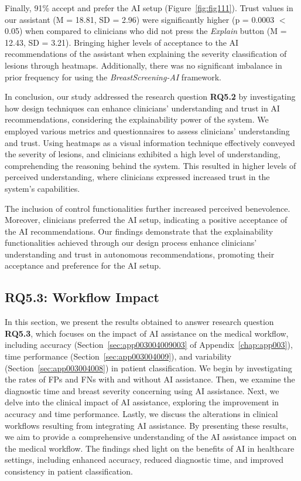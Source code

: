 Finally, 91\% accept and prefer the \ac{AI} setup (Figure~\ref{fig:fig111}).
Trust values in our assistant (M = 18.81, SD = 2.96) were significantly higher (p = 0.0003 $<$ 0.05) when compared to clinicians who did not press the {\it Explain} button (M = 12.43, SD = 3.21).
Bringing higher levels of acceptance to the \ac{AI} recommendations of the assistant when explaining the severity classification of lesions through heatmaps.
Additionally, there was no significant imbalance in prior frequency for using the {\it BreastScreening-AI} framework.

In conclusion, our study addressed the research question {\bf RQ5.2} by investigating how design techniques can enhance clinicians' understanding and trust in \ac{AI} recommendations, considering the explainability power of the system.
We employed various metrics and questionnaires to assess clinicians' understanding and trust.
Using heatmaps as a visual information technique effectively conveyed the severity of lesions, and clinicians exhibited a high level of understanding, comprehending the reasoning behind the system.
This resulted in higher levels of perceived understanding, where clinicians expressed increased trust in the system's capabilities.

The inclusion of control functionalities further increased perceived benevolence.
Moreover, clinicians preferred the \ac{AI} setup, indicating a positive acceptance of the \ac{AI} recommendations.
Our findings demonstrate that the explainability functionalities achieved through our design process enhance clinicians' understanding and trust in autonomous recommendations, promoting their acceptance and preference for the \ac{AI} setup.

\subsection{RQ5.3: Workflow Impact}
\label{sec:chap005006003}

In this section, we present the results obtained to answer research question {\bf RQ5.3}, which focuses on the impact of \ac{AI} assistance on the medical workflow, including accuracy (Section~\ref{sec:app003004009003} of Appendix~\ref{chap:app003}), time performance (Section~\ref{sec:app003004009}), and variability (Section~\ref{sec:app003004008}) in patient classification.
We begin by investigating the rates of \acp{FP} and \acp{FN} with and without \ac{AI} assistance.
Then, we examine the diagnostic time and breast severity concerning using \ac{AI} assistance.
Next, we delve into the clinical impact of \ac{AI} assistance, exploring the improvement in accuracy and time performance.
Lastly, we discuss the alterations in clinical workflows resulting from integrating \ac{AI} assistance.
By presenting these results, we aim to provide a comprehensive understanding of the \ac{AI} assistance impact on the medical workflow.
The findings shed light on the benefits of \ac{AI} in healthcare settings, including enhanced accuracy, reduced diagnostic time, and improved consistency in patient classification.

